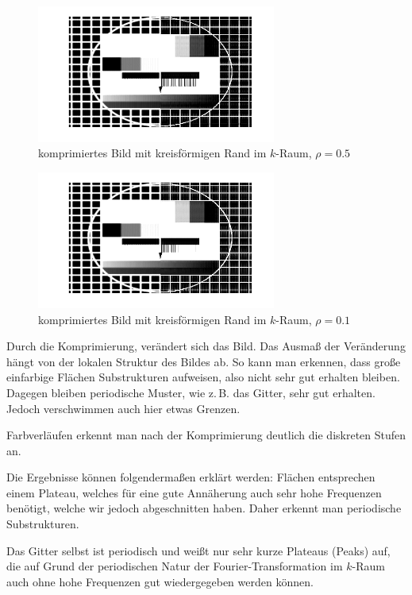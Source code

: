\begin{figure}[htb]
\centering
  \includegraphics[width=0.7\textwidth,keepaspectratio]{../tmp/eins_c_0_5}
  \caption{komprimiertes Bild mit kreisförmigen Rand im $k$-Raum, $ρ=0.5$}
  \label{fig:1d5}
\end{figure}

\begin{figure}[htb]
\centering
  \includegraphics[width=0.7\textwidth,keepaspectratio]{../tmp/eins_c_0_1}
  \caption{komprimiertes Bild mit kreisförmigen Rand im $k$-Raum, $ρ=0.1$}
  \label{fig:1d1}
\end{figure}

Durch die Komprimierung, verändert sich das Bild. Das Ausmaß der Veränderung
hängt von der lokalen Struktur des Bildes ab. So kann man erkennen, dass
große einfarbige Flächen Substrukturen aufweisen, also nicht sehr gut erhalten
bleiben. Dagegen bleiben periodische Muster, wie z.\,B. das Gitter, sehr gut
erhalten. Jedoch verschwimmen auch hier etwas Grenzen.

Farbverläufen erkennt man nach der Komprimierung deutlich die diskreten Stufen an.

Die Ergebnisse können folgendermaßen erklärt werden: Flächen entsprechen einem Plateau,
welches für eine gute Annäherung auch sehr hohe Frequenzen benötigt, welche wir jedoch
abgeschnitten haben. Daher erkennt man periodische Substrukturen.

Das Gitter selbst ist periodisch und weißt nur sehr kurze Plateaus (Peaks) auf, die auf Grund
der periodischen Natur der Fourier-Transformation im $k$-Raum auch ohne hohe Frequenzen
gut wiedergegeben werden können.

